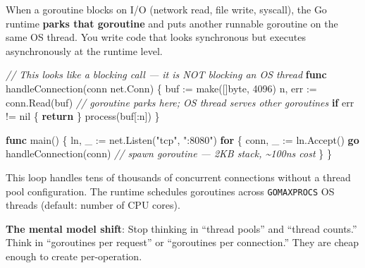 \documentclass[
]{article}
\newenvironment{Shaded}{}{}
\newcommand{\BuiltInTok}[1]{\textcolor[rgb]{0.00,0.50,0.00}{#1}}
\newcommand{\CommentTok}[1]{\textcolor[rgb]{0.38,0.63,0.69}{\textit{#1}}}
\newcommand{\ControlFlowTok}[1]{\textcolor[rgb]{0.00,0.44,0.13}{\textbf{#1}}}
\newcommand{\DataTypeTok}[1]{\textcolor[rgb]{0.56,0.13,0.00}{#1}}
\newcommand{\DecValTok}[1]{\textcolor[rgb]{0.25,0.63,0.44}{#1}}
\newcommand{\KeywordTok}[1]{\textcolor[rgb]{0.00,0.44,0.13}{\textbf{#1}}}
\newcommand{\NormalTok}[1]{#1}
\newcommand{\OperatorTok}[1]{\textcolor[rgb]{0.40,0.40,0.40}{#1}}
\newcommand{\OtherTok}[1]{\textcolor[rgb]{0.00,0.44,0.13}{#1}}
\newcommand{\StringTok}[1]{\textcolor[rgb]{0.25,0.44,0.63}{#1}}
\begin{document}
When a goroutine blocks on I/O (network read, file write, syscall), the
Go runtime \textbf{parks that goroutine} and puts another runnable
goroutine on the same OS thread. You write code that looks synchronous
but executes asynchronously at the runtime level.

\begin{Shaded}
\begin{Highlighting}[]
\CommentTok{// This looks like a blocking call — it is NOT blocking an OS thread}
\KeywordTok{func}\NormalTok{ handleConnection}\OperatorTok{(}\NormalTok{conn net}\OperatorTok{.}\NormalTok{Conn}\OperatorTok{)} \OperatorTok{\{}
\NormalTok{    buf }\OperatorTok{:=} \BuiltInTok{make}\OperatorTok{([]}\DataTypeTok{byte}\OperatorTok{,} \DecValTok{4096}\OperatorTok{)}
\NormalTok{    n}\OperatorTok{,}\NormalTok{ err }\OperatorTok{:=}\NormalTok{ conn}\OperatorTok{.}\NormalTok{Read}\OperatorTok{(}\NormalTok{buf}\OperatorTok{)} \CommentTok{// goroutine parks here; OS thread serves other goroutines}
    \ControlFlowTok{if}\NormalTok{ err }\OperatorTok{!=} \OtherTok{nil} \OperatorTok{\{}
        \ControlFlowTok{return}
    \OperatorTok{\}}
\NormalTok{    process}\OperatorTok{(}\NormalTok{buf}\OperatorTok{[:}\NormalTok{n}\OperatorTok{])}
\OperatorTok{\}}

\KeywordTok{func}\NormalTok{ main}\OperatorTok{()} \OperatorTok{\{}
\NormalTok{    ln}\OperatorTok{,}\NormalTok{ \_ }\OperatorTok{:=}\NormalTok{ net}\OperatorTok{.}\NormalTok{Listen}\OperatorTok{(}\StringTok{"tcp"}\OperatorTok{,} \StringTok{":8080"}\OperatorTok{)}
    \ControlFlowTok{for} \OperatorTok{\{}
\NormalTok{        conn}\OperatorTok{,}\NormalTok{ \_ }\OperatorTok{:=}\NormalTok{ ln}\OperatorTok{.}\NormalTok{Accept}\OperatorTok{()}
        \ControlFlowTok{go}\NormalTok{ handleConnection}\OperatorTok{(}\NormalTok{conn}\OperatorTok{)} \CommentTok{// spawn goroutine — 2KB stack, \textasciitilde{}100ns cost}
    \OperatorTok{\}}
\OperatorTok{\}}
\end{Highlighting}
\end{Shaded}

This loop handles tens of thousands of concurrent connections without a
thread pool configuration. The runtime schedules goroutines across
\texttt{GOMAXPROCS} OS threads (default: number of CPU cores).

\textbf{The mental model shift}: Stop thinking in ``thread pools'' and
``thread counts.'' Think in ``goroutines per request'' or ``goroutines
per connection.'' They are cheap enough to create per-operation.
\end{document}
